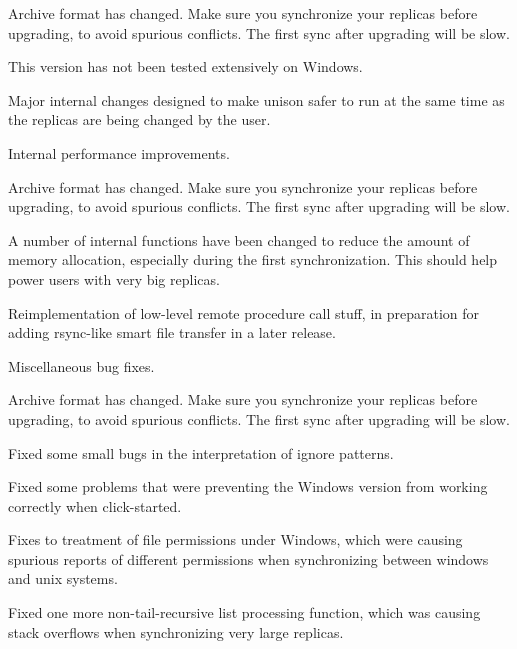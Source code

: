 \begin{changesfromversion}{1.200}
\item \incompatible{} Archive format has changed.  Make sure you
synchronize your replicas before upgrading, to avoid spurious
conflicts.  The first sync after upgrading will be slow.

\item This version has not been tested extensively on Windows.

\item Major internal changes designed to make unison safer to run
at the same time as the replicas are being changed by the user.

\item Internal performance improvements.  
\end{changesfromversion}

\begin{changesfromversion}{1.190}
\item \incompatible{} Archive format has changed.  Make sure you
synchronize your replicas before upgrading, to avoid spurious
conflicts.  The first sync after upgrading will be slow.

\item A number of internal functions have been changed to reduce the
amount of memory allocation, especially during the first
synchronization.  This should help power users with very big replicas.

\item Reimplementation of low-level remote procedure call stuff, in
preparation for adding rsync-like smart file transfer in a later
release.   

\item Miscellaneous bug fixes.
\end{changesfromversion}

\begin{changesfromversion}{1.180}
\item \incompatible{} Archive format has changed.  Make sure you
synchronize your replicas before upgrading, to avoid spurious
conflicts.  The first sync after upgrading will be slow.

\item Fixed some small bugs in the interpretation of ignore patterns. 

\item Fixed some problems that were preventing the Windows version
from working correctly when click-started.

\item Fixes to treatment of file permissions under Windows, which were
causing spurious reports of different permissions when synchronizing
between windows and unix systems.

\item Fixed one more non-tail-recursive list processing function,
which was causing stack overflows when synchronizing very large
replicas. 
\end{changesfromversion}

